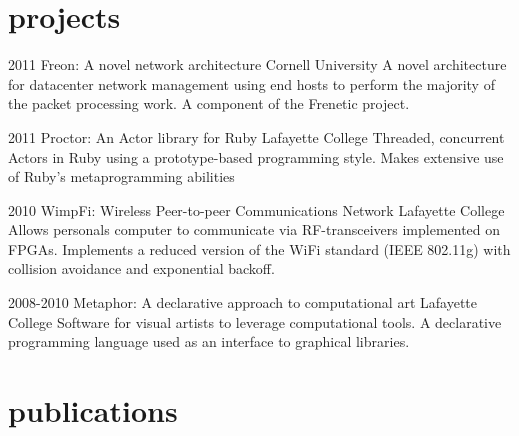 \documentclass[print]{cv}
\begin{document}
\section{projects}

\begin{entrylist}
  \entry
    {2011}
    {Freon: A novel network architecture}
    {Cornell University}
    {A novel architecture for datacenter network management using end hosts to
      perform the majority of the packet processing work. A component of the
      Frenetic project.}

  \entry
    {2011}
    {Proctor: An Actor library for Ruby}
    {Lafayette College}
    {Threaded, concurrent Actors in Ruby using a prototype-based programming
      style. Makes extensive use of Ruby's metaprogramming abilities}

  \entry
    {2010}
    {WimpFi: Wireless Peer-to-peer Communications Network}
    {Lafayette College}
    {Allows personals computer to communicate via RF-transceivers implemented on
      FPGAs. Implements a reduced version of the WiFi standard (IEEE 802.11g)
      with collision avoidance and exponential backoff.}

  \entry
    {2008-2010}
    {Metaphor: A declarative approach to computational art}
    {Lafayette College}
    {Software for visual artists to leverage computational tools. A declarative
      programming language used as an interface to graphical libraries.}


\end{entrylist}

\section{publications}
\end{document}
